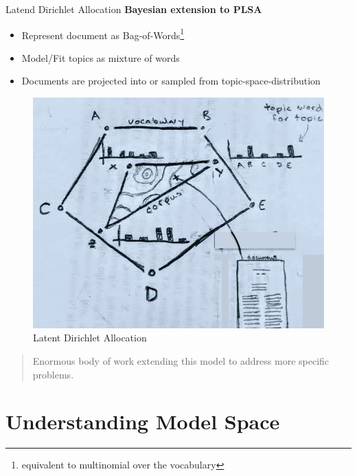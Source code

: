 \documentclass[10pt]{beamer}
\begin{document}
\begin{frame}{Latend Dirichlet Allocation}
  {\bf Bayesian extension to PLSA}

  \begin{multicols}{2}

  \begin{itemize}
  \item Represent document as Bag-of-Words\footnote{equivalent to multinomial over the vocabulary}
  \item Model/Fit topics as mixture of words
  \item Documents are projected into or sampled from topic-space-distribution
  \end{itemize}

  \begin{figure}
  \includegraphics[width=\columnwidth]{./lda-draw.png}
  \caption{Latent Dirichlet Allocation}
  \end{figure}

  \end{multicols}

  \begin{quote}
    Enormous body of work extending this model to address more specific problems.
  \end{quote}

\end{frame}

\section{Understanding Model Space}
\end{document}
